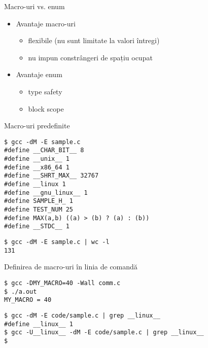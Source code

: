 \documentclass{beamer}
\begin{document}
\begin{frame}{Macro-uri vs. enum}
	\begin{itemize}
		\pause \item Avantaje macro-uri
			\begin{itemize}
				\pause \item flexibile (nu sunt limitate la valori întregi)
				\pause \item nu impun constrângeri de spațiu ocupat
			\end{itemize}
		\pause \item Avantaje enum
			\begin{itemize}
				\pause \item type safety
				\pause \item block scope
			\end{itemize}
	\end{itemize}
\end{frame}

\begin{frame}{Macro-uri predefinite}
	\begin{beamerboxesrounded}[lower=block body,shadow=true]{}
\texttt{\$ gcc -dM -E sample.c \\
\#define \_\_CHAR\_BIT\_\_ 8 \\
\#define \_\_unix\_\_ 1 \\
\#define \_\_x86\_64 1 \\
\#define \_\_SHRT\_MAX\_\_ 32767 \\
\#define \_\_linux 1 \\
\#define \_\_gnu\_linux\_\_ 1 \\
\#define SAMPLE\_H\_ 1 \\
\#define TEST\_NUM 25 \\
\#define MAX(a,b) ((a) > (b) ? (a) : (b)) \\
\#define \_\_STDC\_\_ 1
		}
	\end{beamerboxesrounded}
	\begin{beamerboxesrounded}[lower=block body,shadow=true]{}
\texttt{\$ gcc -dM -E sample.c | wc -l \\
131
}
	\end{beamerboxesrounded}
\end{frame}

\begin{frame}{Definirea de macro-uri în linia de comandă}
	\begin{beamerboxesrounded}[lower=block body,shadow=true]{}
		 \texttt{\$ gcc -DMY\_MACRO=40 -Wall comm.c \\
\$ ./a.out \\
MY\_MACRO = 40
		}
	\end{beamerboxesrounded}
	\begin{beamerboxesrounded}[lower=block body,shadow=true]{}
		\texttt{\$ gcc -dM -E code/sample.c | grep \_\_linux\_\_ \\
\#define \_\_linux\_\_ 1 \\
\$ gcc -U\_\_linux\_\_ -dM -E code/sample.c | grep \_\_linux\_\_ \\
\$
		}
	\end{beamerboxesrounded}
\end{frame}
\end{document}

